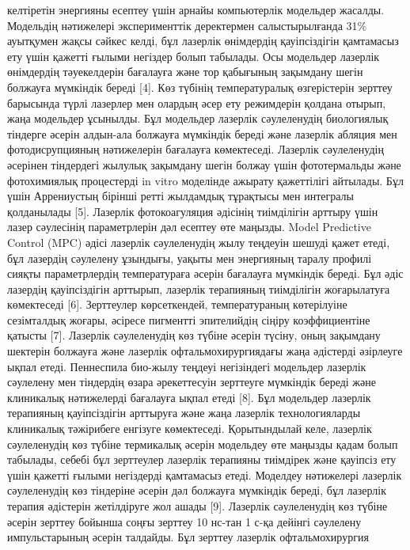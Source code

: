 \begin{multicols}{2}
келтіретін энергияны есептеу үшін арнайы компьютерлік модельдер жасалды.
Модельдің нәтижелері эксперименттік деректермен салыстырылғанда 31\%
ауытқумен жақсы сәйкес келді, бұл лазерлік өнімдердің қауіпсіздігін
қамтамасыз ету үшін қажетті ғылыми негіздер болып табылады. Осы
модельдер лазерлік өнімдердің тәуекелдерін бағалауға және тор қабығының
зақымдану шегін болжауға мүмкіндік береді {[}4{]}. Көз түбінің
температуралық өзгерістерін зерттеу барысында түрлі лазерлер мен олардың
әсер ету режимдерін қолдана отырып, жаңа модельдер ұсынылды. Бұл
модельдер лазерлік сәулеленудің биологиялық тіндерге әсерін алдын-ала
болжауға мүмкіндік береді және лазерлік абляция мен фотодисрупцияның
нәтижелерін бағалауға көмектеседі. Лазерлік сәулеленудің әсерінен
тіндердегі жылулық зақымдану шегін болжау үшін фототермальды және
фотохимиялық процестерді in vitro моделінде ажырату қажеттілігі
айтылады. Бұл үшін Аррениустың бірінші ретті жылдамдық тұрақтысы мен
интегралы қолданылады {[}5{]}. Лазерлік фотокоагуляция әдісінің
тиімділігін арттыру үшін лазер сәулесінің параметрлерін дәл есептеу өте
маңызды. Model Predictive Control (MPC) әдісі лазерлік сәулеленудің жылу
теңдеуін шешуді қажет етеді, бұл лазердің сәулелену ұзындығы, уақыты мен
энергияның таралу профилі сияқты параметрлердің температураға әсерін
бағалауға мүмкіндік береді. Бұл әдіс лазердің қауіпсіздігін арттырып,
лазерлік терапияның тиімділігін жоғарылатуға көмектеседі {[}6{]}.
Зерттеулер көрсеткендей, температураның көтерілуіне сезімталдық жоғары,
әсіресе пигментті эпителийдің сіңіру коэффициентіне қатысты {[}7{]}.
Лазерлік сәулеленудің көз түбіне әсерін түсіну, оның зақымдану шектерін
болжауға және лазерлік офтальмохирургиядағы жаңа әдістерді әзірлеуге
ықпал етеді. Пеннеспила био-жылу теңдеуі негізіндегі модельдер лазерлік
сәулелену мен тіндердің өзара әрекеттесуін зерттеуге мүмкіндік береді
және клиникалық нәтижелерді бағалауға ықпал етеді {[}8{]}. Бұл модельдер
лазерлік терапияның қауіпсіздігін арттыруға және жаңа лазерлік
технологияларды клиникалық тәжірибеге енгізуге көмектеседі. Қорытындылай
келе, лазерлік сәулеленудің көз түбіне термикалық әсерін модельдеу өте
маңызды қадам болып табылады, себебі бұл зерттеулер лазерлік терапияны
тиімдірек және қауіпсіз ету үшін қажетті ғылыми негіздерді қамтамасыз
етеді. Моделдеу нәтижелері лазерлік сәулеленудің көз тіндеріне әсерін
дәл болжауға мүмкіндік береді, бұл лазерлік терапия әдістерін
жетілдіруге жол ашады {[}9{]}. Лазерлік сәулеленудің көз түбіне әсерін
зерттеу бойынша соңғы зерттеу 10 нс-тан 1 с-қа дейінгі сәулелену
импульстарының әсерін талдайды. Бұл зерттеу лазерлік офтальмохирургия

\end{multicols}
